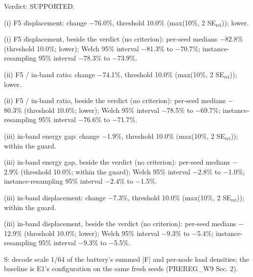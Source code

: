 \begin{table}[t]
\smallskip
\begin{minipage}{\linewidth}\footnotesize\raggedright
Verdict: SUPPORTED.\par
(i) F5 displacement: change $-$76.0\%, threshold 10.0\% (max(10\%, 2 SE$_\mathrm{rel}$)); lower.\par
(i) F5 displacement, beside the verdict (no criterion): per-seed medians $-$82.8\% (threshold 10.0\%; lower); Welch 95\% interval $-$81.3\% to $-$70.7\%; instance-resampling 95\% interval $-$78.3\% to $-$73.9\%.\par
(ii) F5 / in-band ratio: change $-$74.1\%, threshold 10.0\% (max(10\%, 2 SE$_\mathrm{rel}$)); lower.\par
(ii) F5 / in-band ratio, beside the verdict (no criterion): per-seed medians $-$80.3\% (threshold 10.0\%; lower); Welch 95\% interval $-$78.5\% to $-$69.7\%; instance-resampling 95\% interval $-$76.6\% to $-$71.7\%.\par
(iii) in-band energy gap: change $-$1.9\%, threshold 10.0\% (max(10\%, 2 SE$_\mathrm{rel}$)); within the guard.\par
(iii) in-band energy gap, beside the verdict (no criterion): per-seed medians $-$2.9\% (threshold 10.0\%; within the guard); Welch 95\% interval $-$2.8\% to $-$1.0\%; instance-resampling 95\% interval $-$2.4\% to $-$1.5\%.\par
(iii) in-band displacement: change $-$7.3\%, threshold 10.0\% (max(10\%, 2 SE$_\mathrm{rel}$)); within the guard.\par
(iii) in-band displacement, beside the verdict (no criterion): per-seed medians $-$12.9\% (threshold 10.0\%; lower); Welch 95\% interval $-$9.3\% to $-$5.4\%; instance-resampling 95\% interval $-$9.3\% to $-$5.5\%.\par
S: decode scale 1/64 of the battery's summed |F| and per-node load densities; the baseline is E1's configuration on the same fresh seeds (PREREG\_W9 Sec. 2).
\end{minipage}
\end{table}
